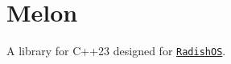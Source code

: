 \chapter{Melon }
\hypertarget{md_README}{}\label{md_README}
\label{md_README_autotoc_md0}%
%


A library for C++23 designed for \href{https://github.com/wither16x/radish_os}{\texttt{Radish\+OS}}. 